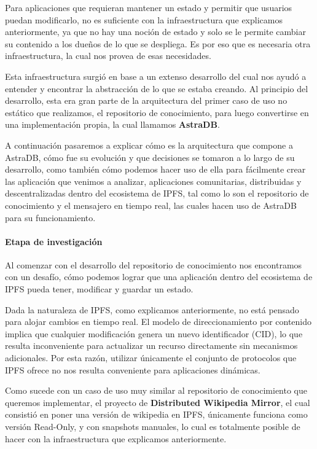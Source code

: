 Para aplicaciones que requieran mantener un estado y permitir que usuarios puedan modificarlo, no es suficiente con la infraestructura que explicamos anteriormente, ya que no hay una noción de estado y solo se le permite cambiar su contenido a los dueños de lo que se despliega. Es por eso que es necesaria otra infraestructura, la cual nos provea de esas necesidades.

Esta infraestructura surgió en base a un extenso desarrollo del cual nos ayudó a entender y encontrar la abstracción de lo que se estaba creando. Al principio del desarrollo, esta era gran parte de la arquitectura del primer caso de uso no estático que realizamos, el repositorio de conocimiento, para luego convertirse en una implementación propia, la cual llamamos \textbf{AstraDB}.

A continuación pasaremos a explicar cómo es la arquitectura que compone a AstraDB, cómo fue su evolución y que decisiones se tomaron a lo largo de su desarrollo, como también cómo podemos hacer uso de ella para fácilmente crear las aplicación que venimos a analizar, aplicaciones comunitarias, distribuidas y descentralizadas dentro del ecosistema de IPFS, tal como lo son el repositorio de conocimiento y el mensajero en tiempo real, las cuales hacen uso de AstraDB para su funcionamiento.

\paragraph{Etapa de investigación}

Al comenzar con el desarrollo del repositorio de conocimiento nos encontramos con un desafío, cómo podemos lograr que una aplicación dentro del ecosistema de IPFS pueda tener, modificar y guardar un estado.

Dada la naturaleza de IPFS, como explicamos anteriormente, no está pensado para alojar cambios en tiempo real. El modelo de direccionamiento por contenido implica que cualquier modificación genera un nuevo identificador (CID), lo que resulta inconveniente para actualizar un recurso directamente sin mecanismos adicionales. Por esta razón, utilizar únicamente el conjunto de protocolos que IPFS ofrece no nos resulta conveniente para aplicaciones dinámicas.

Como sucede con un caso de uso muy similar al repositorio de conocimiento que queremos implementar, el proyecto de \textbf{Distributed Wikipedia Mirror}\cite{distributed-wikipedia-mirror}, el cual consistió en poner una versión de wikipedia en IPFS, únicamente funciona como versión Read-Only, y con snapshots manuales, lo cual es totalmente posible de hacer con la infraestructura que explicamos anteriormente.

